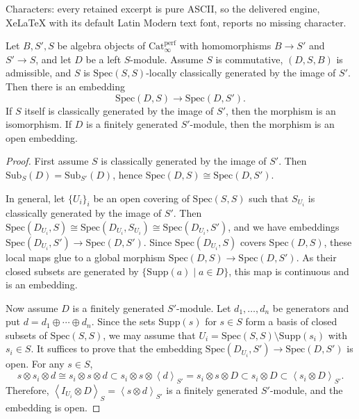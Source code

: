 \documentclass[10pt,a4paper]{amsart}
\newcommand{\Perf}{\mathrm{Cat}_{\infty}^{\mathrm{perf}}}
\newcommand{\Spec}{\mathrm{Spec}}
\newcommand{\Sub}{\mathrm{Sub}}
\newcommand{\Supp}{\mathrm{Supp}}
\newcommand{\ang}[1]{{\left\langle{#1}\right\rangle}}
\begin{document}
Characters: every retained excerpt is pure ASCII, so the delivered engine, XeLaTeX with its default Latin Modern text font, reports no missing character.
\begin{thm}\label{thm:restriction_of_the_base}
Let \(B,S',S\) be algebra objects of \(\Perf\) with homomorphisms \(B\to S'\) and \(S'\to S\), and let \(D\) be a left \(S\)-module.
Assume \(S\) is commutative, \((D,S,B)\) is admissible, and \(S\) is \(\Spec(S,S)\)-locally classically generated by the image of \(S'\).
Then there is an embedding 
\[
\Spec(D,S)\to \Spec(D,S').
\]
If \(S\) itself is classically generated by the image of \(S'\), then the morphism is an isomorphism.
If \(D\) is a finitely generated \(S'\)-module, then the morphism is an open embedding.
\end{thm}

\begin{proof}
  First assume \(S\) is classically generated by the image of \(S'\).
  Then \(\Sub_S(D)=\Sub_{S'}(D)\), hence \(\Spec(D,S)\cong \Spec(D,S')\).

  In general, let \(\{U_i\}_i\) be an open covering of \(\Spec(S,S)\) such that \(S_{U_i}\) is classically generated by the image of \(S'\).
  Then
  \(\Spec(D_{U_i},S)\cong \Spec(D_{U_i},S_{U_i})\cong \Spec(D_{U_i},S')\),
  and we have embeddings \(\Spec(D_{U_i},S')\to \Spec(D,S')\).
  Since \(\Spec(D_{U_i},S)\) covers \(\Spec(D,S)\), these local maps glue to a global morphism \(\Spec(D,S)\to \Spec(D,S')\).
  As their closed subsets are generated by \(\{\Supp(a)\mid a\in D\}\), this map is continuous and is an embedding.

  Now assume \(D\) is a finitely generated \(S'\)-module.
  Let \(d_1,\ldots,d_n\) be generators and put \(d=d_1\oplus \cdots \oplus d_n\).
  Since the sets \(\Supp(s)\) for \(s\in S\) form a basis of closed subsets of \(\Spec(S,S)\), we may assume that \(U_i=\Spec(S,S)\setminus \Supp(s_i)\) with \(s_i\in S\).
  It suffices to prove that the embedding \(\Spec(D_{U_i},S')\to \Spec(D,S')\) is open.
  For any \(s\in S\),
  \[
  s\otimes s_i\otimes d
  \cong s_i\otimes s\otimes d
  \subset s_i\otimes s\otimes \ang{d}_{S'}
  =s_i\otimes s\otimes D
  \subset s_i\otimes D
  \subset \ang{s_i\otimes D}_{S'}.
  \]
  Therefore, \(\ang{I_{U_i}\otimes D}_{S}=\ang{s\otimes d}_{S'}\) is a finitely generated \(S'\)-module, and the embedding is open.
\end{proof}
\end{document}
